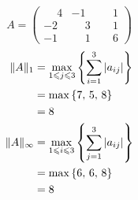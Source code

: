 \documentclass[11pt]{article}
\begin{document}
\begin{question}
\begin{subquestion}{}
{\begin{equation*}
                A = \begin{pmatrix}
                    \phantom{-}4 & -1           & \phantom{-}1 \\
                    -2           & \phantom{-}3 & \phantom{-}1 \\
                    -1           & \phantom{-}1 & \phantom{-}6
                \end{pmatrix}
            \end{equation*}
        }
        \answer
        {
            \begin{align*}
                \Arrowvert A \Arrowvert_1      & = \max_{1 \leqslant j \leqslant 3}{\left\{\sum_{i = 1}^{3}{\arrowvert a_{ij} \arrowvert}\right\}} \\
                                               & = \max{\{7,\, 5,\, 8\}}                                                                           \\
                                               & = 8                                                                                               \\
                \Arrowvert A \Arrowvert_\infty & = \max_{1 \leqslant i \leqslant 3}{\left\{\sum_{j = 1}^{3}{\arrowvert a_{ij} \arrowvert}\right\}} \\
                                               & = \max{\{6,\, 6,\, 8\}}                                                                           \\
                                               & = 8
            \end{align*}
        }
    \end{subquestion}

\end{question}
\end{document}
